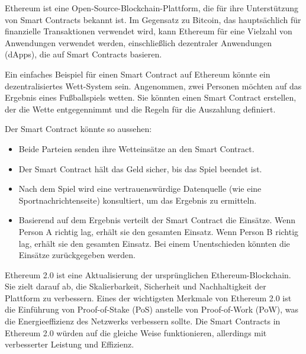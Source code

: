 Ethereum ist eine Open-Source-Blockchain-Plattform, die für ihre Unterstützung von Smart Contracts bekannt ist. Im Gegensatz zu Bitcoin, das hauptsächlich für finanzielle Transaktionen verwendet wird, kann Ethereum für eine Vielzahl von Anwendungen verwendet werden, einschließlich dezentraler Anwendungen (dApps), die auf Smart Contracts basieren.

Ein einfaches Beispiel für einen Smart Contract auf Ethereum könnte ein dezentralisiertes Wett-System sein. Angenommen, zwei Personen möchten auf das Ergebnis eines Fußballspiels wetten. Sie könnten einen Smart Contract erstellen, der die Wette entgegennimmt und die Regeln für die Auszahlung definiert.

Der Smart Contract könnte so aussehen:
\begin{itemize}
\item Beide Parteien senden ihre Wetteinsätze an den Smart Contract.
\item Der Smart Contract hält das Geld sicher, bis das Spiel beendet ist.
\item Nach dem Spiel wird eine vertrauenswürdige Datenquelle (wie eine Sportnachrichtenseite) konsultiert, um das Ergebnis zu ermitteln.
\item Basierend auf dem Ergebnis verteilt der Smart Contract die Einsätze. Wenn Person A richtig lag, erhält sie den gesamten Einsatz. Wenn Person B richtig lag, erhält sie den gesamten Einsatz. Bei einem Unentschieden könnten die Einsätze zurückgegeben werden.
\end{itemize}
Ethereum 2.0 ist eine Aktualisierung der ursprünglichen Ethereum-Blockchain. Sie zielt darauf ab, die Skalierbarkeit, Sicherheit und Nachhaltigkeit der Plattform zu verbessern. Eines der wichtigsten Merkmale von Ethereum 2.0 ist die Einführung von Proof-of-Stake (PoS) anstelle von Proof-of-Work (PoW), was die Energieeffizienz des Netzwerks verbessern sollte. Die Smart Contracts in Ethereum 2.0 würden auf die gleiche Weise funktionieren, allerdings mit verbesserter Leistung und Effizienz.



